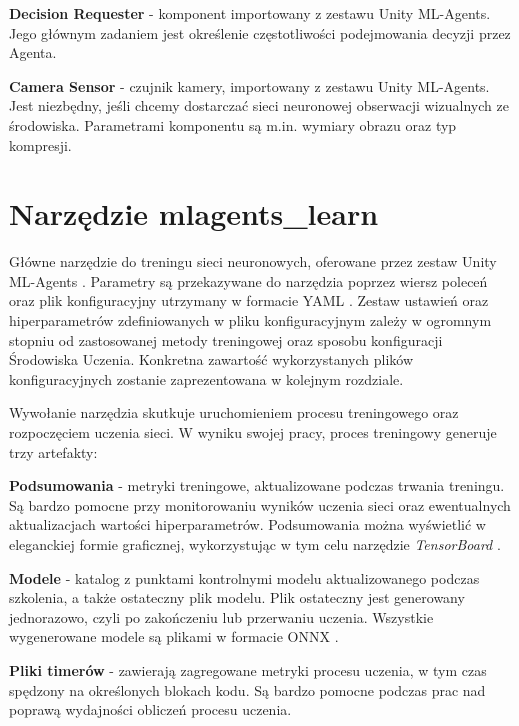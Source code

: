 \begin{enumerate*}
\item \textbf{Decision Requester} - komponent importowany z zestawu Unity ML-Agents. Jego głównym zadaniem jest określenie częstotliwości podejmowania decyzji przez Agenta.
\item \textbf{Camera Sensor} - czujnik kamery, importowany z zestawu Unity ML-Agents. Jest niezbędny, jeśli chcemy dostarczać sieci neuronowej obserwacji wizualnych ze środowiska. Parametrami komponentu są m.in. wymiary obrazu oraz typ kompresji.
\end{enumerate*}

\clearpage
\section{Narzędzie mlagents\_learn}
Główne narzędzie do treningu sieci neuronowych, oferowane przez zestaw Unity ML-Agents \cite{unitymla:trainingMlAgents}. Parametry są przekazywane do narzędzia poprzez wiersz poleceń oraz plik konfiguracyjny utrzymany w formacie YAML \cite{unitymla:configFile}. Zestaw ustawień oraz hiperparametrów zdefiniowanych w pliku konfiguracyjnym zależy w ogromnym stopniu od zastosowanej metody treningowej oraz sposobu konfiguracji Środowiska Uczenia. Konkretna zawartość wykorzystanych plików konfiguracyjnych zostanie zaprezentowana w kolejnym rozdziale.

Wywołanie narzędzia skutkuje uruchomieniem procesu treningowego oraz rozpoczęciem uczenia sieci. W wyniku swojej pracy, proces treningowy generuje trzy artefakty:
\begin{enumerate*}
\item \textbf{Podsumowania} - metryki treningowe, aktualizowane podczas trwania treningu. Są bardzo pomocne przy monitorowaniu wyników uczenia sieci oraz ewentualnych aktualizacjach wartości hiperparametrów. Podsumowania można wyświetlić w eleganckiej formie graficznej, wykorzystując w tym celu narzędzie \textit{TensorBoard} \cite{unitymla:tensorboard}.
\item \textbf{Modele} - katalog z punktami kontrolnymi modelu aktualizowanego podczas szkolenia, a także ostateczny plik modelu. Plik ostateczny jest generowany jednorazowo, czyli po zakończeniu lub przerwaniu uczenia. Wszystkie wygenerowane modele są plikami w formacie ONNX \cite{onnx:website}.
\item \textbf{Pliki timerów} - zawierają zagregowane metryki procesu uczenia, w tym czas spędzony na określonych blokach kodu. Są bardzo pomocne podczas prac nad poprawą wydajności obliczeń procesu uczenia.
\end{enumerate*}

